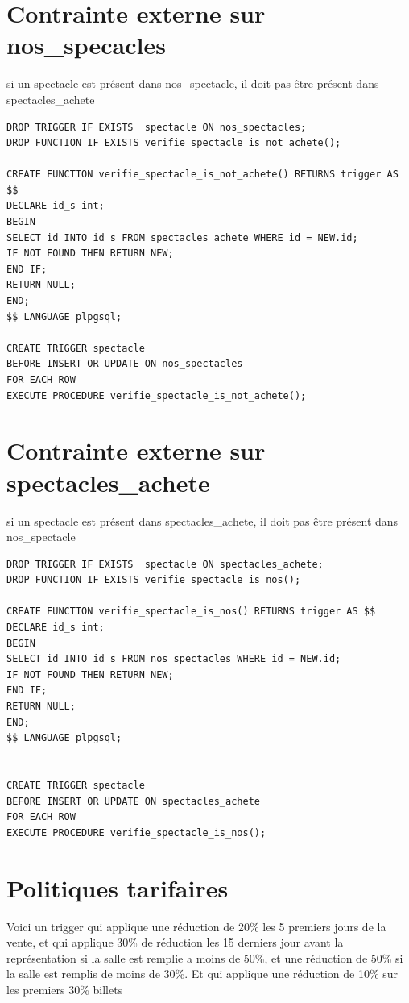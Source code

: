 \documentclass[10pt]{report}
\begin{document}
\section{Contrainte externe sur nos\_specacles}
si un spectacle est présent dans nos\_spectacle, il doit pas être présent dans spectacles\_achete
\begin{lstlisting}
DROP TRIGGER IF EXISTS  spectacle ON nos_spectacles;
DROP FUNCTION IF EXISTS verifie_spectacle_is_not_achete();

CREATE FUNCTION verifie_spectacle_is_not_achete() RETURNS trigger AS $$ 
DECLARE id_s int;
BEGIN
SELECT id INTO id_s FROM spectacles_achete WHERE id = NEW.id;
IF NOT FOUND THEN RETURN NEW;
END IF;
RETURN NULL;
END; 
$$ LANGUAGE plpgsql;

CREATE TRIGGER spectacle
BEFORE INSERT OR UPDATE ON nos_spectacles
FOR EACH ROW
EXECUTE PROCEDURE verifie_spectacle_is_not_achete();
\end{lstlisting}

\section{Contrainte externe sur spectacles\_achete}
si un spectacle est présent dans spectacles\_achete, il doit pas être présent dans nos\_spectacle
\begin{lstlisting}
DROP TRIGGER IF EXISTS  spectacle ON spectacles_achete;
DROP FUNCTION IF EXISTS verifie_spectacle_is_nos();

CREATE FUNCTION verifie_spectacle_is_nos() RETURNS trigger AS $$ 
DECLARE id_s int;
BEGIN
SELECT id INTO id_s FROM nos_spectacles WHERE id = NEW.id;
IF NOT FOUND THEN RETURN NEW;
END IF;
RETURN NULL;
END; 
$$ LANGUAGE plpgsql;


CREATE TRIGGER spectacle
BEFORE INSERT OR UPDATE ON spectacles_achete
FOR EACH ROW
EXECUTE PROCEDURE verifie_spectacle_is_nos();
\end{lstlisting}

\section{Politiques tarifaires}
Voici un trigger qui applique une réduction de 20\% les 5 premiers jours de la vente, et qui applique 30\% de réduction les 15 derniers jour avant la représentation si la salle est remplie a moins de 50\%, et une réduction de 50\% si la salle est remplis de moins de 30\%.
Et qui applique une réduction de 10\% sur les premiers 30\% billets 
\end{document}
